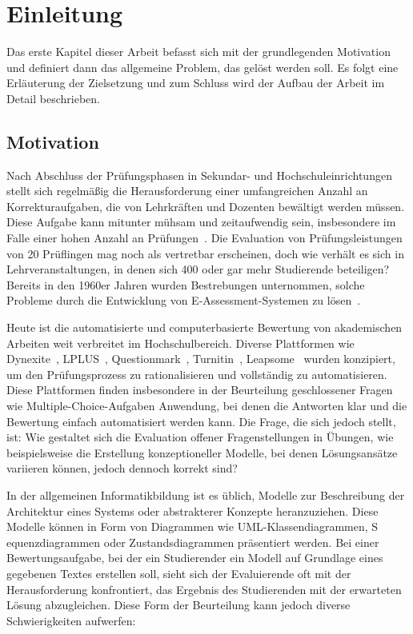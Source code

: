 \chapter{Einleitung}

Das erste Kapitel dieser Arbeit befasst sich mit der grundlegenden Motivation und definiert dann das allgemeine Problem, das gelöst werden soll. Es folgt eine Erläuterung der Zielsetzung und zum Schluss wird der Aufbau der Arbeit im Detail beschrieben.

\section{Motivation}

Nach Abschluss der Prüfungsphasen in Sekundar- und Hochschuleinrichtungen stellt sich regelmäßig die Herausforderung
einer umfangreichen Anzahl an Korrekturaufgaben, die von Lehrkräften und Dozenten bewältigt werden müssen. Diese Aufgabe
kann mitunter mühsam und zeitaufwendig sein, insbesondere im Falle einer hohen Anzahl an Prüfungen~\cite{aufwendig}.
Die Evaluation von Prüfungsleistungen von 20 Prüflingen mag noch als vertretbar erscheinen, doch wie verhält es sich in
Lehrveranstaltungen, in denen sich 400 oder gar mehr Studierende beteiligen? Bereits in den 1960er Jahren wurden
Bestrebungen unternommen, solche Probleme durch die Entwicklung von \gls{E-Assessment-Systemen} zu lösen~\cite{Hollingsworth}.

Heute ist die automatisierte und computerbasierte Bewertung von akademischen Arbeiten weit verbreitet im
Hochschulbereich. Diverse Plattformen wie Dynexite~\cite{Dynexite}, LPLUS~\cite{LPLUS}, Questionmark~\cite{Questionmark},
Turnitin~\cite{Turnitin}, Leapsome~\cite{leapsome} wurden konzipiert, um den Prüfungsprozess zu rationalisieren und vollständig zu automatisieren.
Diese Plattformen finden insbesondere in der Beurteilung geschlossener Fragen wie Multiple-Choice-Aufgaben Anwendung,
bei denen die Antworten klar und die Bewertung einfach automatisiert werden kann. Die Frage, die sich jedoch stellt,
ist: Wie gestaltet sich die Evaluation offener Fragenstellungen in Übungen, wie beispielsweise die Erstellung
konzeptioneller Modelle, bei denen Lösungsansätze variieren können, jedoch dennoch korrekt sind?

In der allgemeinen Informatikbildung ist es üblich, Modelle zur Beschreibung der Architektur eines Systems oder
abstrakterer Konzepte heranzuziehen. Diese Modelle können in Form von Diagrammen wie \ac{UML}-Klassendiagrammen, S
equenzdiagrammen oder Zustandsdiagrammen präsentiert werden. Bei einer Bewertungsaufgabe, bei der ein Studierender ein
Modell auf Grundlage eines gegebenen Textes erstellen soll, sieht sich der Evaluierende oft mit der Herausforderung
konfrontiert, das Ergebnis des Studierenden mit der erwarteten Lösung abzugleichen. Diese Form der Beurteilung kann
jedoch diverse Schwierigkeiten aufwerfen:



